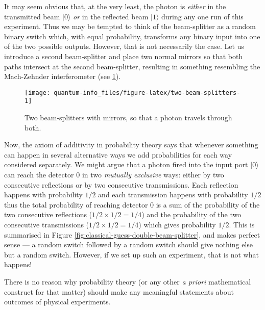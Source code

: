 \documentclass[fleqn]{article}
\newenvironment{idea}{\noindent}{\medskip}
\begin{document}
It may seem obvious that, at the very least, the photon is \emph{either} in the transmitted beam \(|0\rangle\) \emph{or} in the reflected beam \(|1\rangle\) during any one run of this experiment.
Thus we may be tempted to think of the beam-splitter as a random binary switch which, with equal probability, transforms any binary input into one of the two possible outputs.
However, that is not necessarily the case.
Let us introduce a second beam-splitter and place two normal mirrors so that both paths intersect at the second beam-splitter, resulting in something resembling the Mach-Zehnder interferometer (see \ref{fig:two-beam-splitters}).

\begin{figure}[H]

{\centering \texttt{[image: quantum-info\_files/figure-latex/two-beam-splitters-1]} 

}

\caption{Two beam-splitters with mirrors, so that a photon travels through both.}\label{fig:two-beam-splitters}
\end{figure}

Now, the axiom of additivity in probability theory says that whenever something can happen in several alternative ways we add probabilities for each way considered separately.
We might argue that a photon fired into the input port \(|0\rangle\) can reach the detector \(0\) in two \emph{mutually exclusive} ways: either by two consecutive reflections or by two consecutive transmissions.
Each reflection happens with probability \(1/2\) and each transmission happens with probability \(1/2\) thus the total probability of reaching detector 0 is a sum of the probability of the two consecutive reflections (\(1/2\times 1/2 = 1/4\)) and the probability of the two consecutive transmissions (\(1/2\times 1/2 = 1/4\)) which gives probability \(1/2\).
This is summarised in Figure \ref{fig:classical-guess-double-beam-splitter}, and makes perfect sense --- a random switch followed by a random switch should give nothing else but a random switch.
However, if we set up such an experiment, that is not what happens!

\begin{idea}

There is no reason why probability theory (or any other \emph{a priori} mathematical construct for that matter) should make any meaningful statements about outcomes of physical experiments.

\end{idea}
\end{document}
